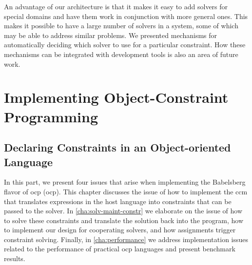 An advantage of our architecture is that it makes it easy to add solvers for
special domains and have them work in conjunction with more general ones. This
makes it possible to have a large number of solvers in a system, some of which
may be able to address similar problems. We presented mechanisms for
automatically deciding which solver to use for a particular constraint. How
these mechanisms can be integrated with development tools is also an area of
future work.













\part{Implementing Object-Constraint Programming}
\label{part:impl-object-constr}

\chapter{Declaring Constraints in an Object-oriented Language}
\label{part:babelsb-object-const}
\lstset{language=ruby}

In this part, we present four issues that arise when implementing the Babelsberg
flavor of \acrlong{ocp} (\acrshort{ocp}). This chapter discusses the issue of
how to implement the \acrlong{ccm} that translates expressions in the host
language into constraints that can be passed to the solver. In
\autoref{cha:solv-maint-constr} we elaborate on the issue of how to solve these
constraints and translate the solution back into the program, how to implement
our design for cooperating solvers, and how assignments trigger constraint
solving. Finally, in \autoref{cha:performance} we address implementation issues
related to the performance of practical \ac{ocp} languages and present benchmark
results.

